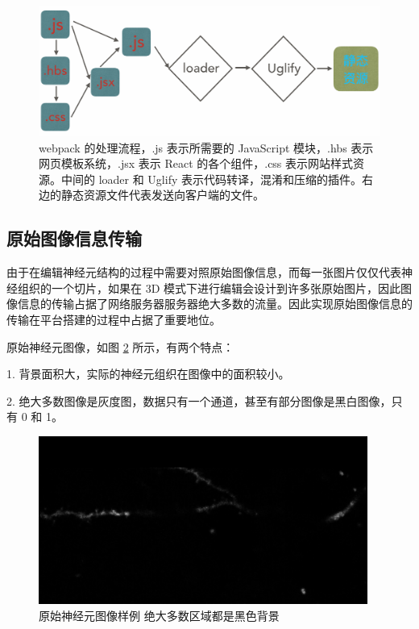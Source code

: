 \begin{figure}[!ht]
\centering
\includegraphics[width=148mm]{images/webpack}
\caption{webpack 的处理流程，.js 表示所需要的 JavaScript 模块，.hbs 表示网页模板系统，.jsx 表示 React  的各个组件，.css 表示网站样式资源。中间的 loader 和 Uglify 表示代码转译，混淆和压缩的插件。右边的静态资源文件代表发送向客户端的文件。}
\label{webpack-flow}
\end{figure}

\subsection{原始图像信息传输}
由于在编辑神经元结构的过程中需要对照原始图像信息，而每一张图片仅仅代表神经组织的一个切片，如果在 3D 模式下进行编辑会设计到许多张原始图片，因此图像信息的传输占据了网络服务器服务器绝大多数的流量。因此实现原始图像信息的传输在平台搭建的过程中占据了重要地位。

原始神经元图像，如图 \ref{neu} 所示，有两个特点：

1. 背景面积大，实际的神经元组织在图像中的面积较小。

2. 绝大多数图像是灰度图，数据只有一个通道，甚至有部分图像是黑白图像，只有 0 和 1。

\begin{figure}[!ht]
\centering
\includegraphics[width=108mm]{images/neu}
\caption{原始神经元图像样例 绝大多数区域都是黑色背景}
\label{neu}
\end{figure}

